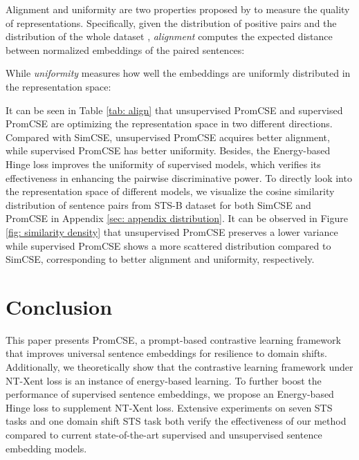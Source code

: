 \documentclass[11pt]{article}
\begin{document}
Alignment and uniformity are two properties proposed by \cite{wang2020alighment} to measure the quality of representations. 
Specifically, given the distribution of positive pairs  and the distribution of the whole dataset , \textit{alignment} computes the expected distance between normalized embeddings of the paired sentences:

While \textit{uniformity} measures how well the embeddings are uniformly distributed in the representation space:

It can be seen in Table \ref{tab: align} that unsupervised PromCSE and supervised PromCSE are optimizing the representation space in two different directions. Compared with SimCSE, unsupervised PromCSE acquires better alignment, while supervised PromCSE has better uniformity. 
Besides, the Energy-based Hinge loss improves the uniformity of supervised models, which verifies its effectiveness in enhancing the pairwise discriminative power.
To directly look into the representation space of different models, we visualize the cosine similarity distribution of sentence pairs from STS-B dataset for both SimCSE and PromCSE in Appendix \ref{sec: appendix distribution}. 
It can be observed in Figure \ref{fig: similarity density} that unsupervised PromCSE preserves a lower variance while supervised PromCSE shows a more scattered distribution compared to SimCSE, corresponding to better alignment and uniformity, respectively.



\section{Conclusion}
This paper presents PromCSE, a prompt-based contrastive learning framework that improves universal sentence embeddings for resilience to domain shifts. Additionally, we theoretically show that the contrastive learning framework under NT-Xent loss is an instance of energy-based learning. To further boost the performance of supervised sentence embeddings, we propose an Energy-based Hinge loss to supplement NT-Xent loss. 
Extensive experiments on seven STS tasks and one domain shift STS task both verify the effectiveness of our method compared to current state-of-the-art supervised and unsupervised sentence embedding models. 
\end{document}
